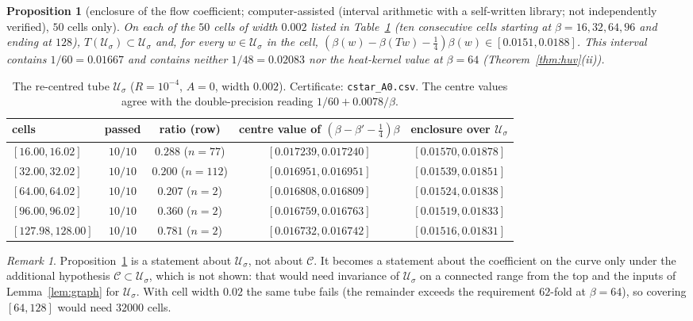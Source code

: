 \documentclass[11pt,a4paper]{article}
\newtheorem{proposition}[theorem]{Proposition}
\theoremstyle{definition}
\theoremstyle{remark}
\newtheorem{remark}[theorem]{Remark}
\newcommand{\code}[1]{\texttt{#1}}
\newcommand{\cU}{\mathcal{U}}
\newcommand{\cC}{\mathcal{C}}
\newcommand{\IA}{computer-assisted (interval arithmetic with a self-written library; not independently verified)}
\begin{document}
\begin{proposition}[enclosure of the flow coefficient; \IA, $50$ cells only]\label{prop:window}
On each of the $50$ cells of width $0.002$ listed in Table~\ref{tab:cstar} (ten consecutive cells starting at $\beta=16,32,64,96$ and ending at $128$), $T(\cU_\sigma)\subset\cU_\sigma$ and, for every $w\in\cU_\sigma$ in the cell, $(\beta(w)-\beta(Tw)-\tfrac14)\beta(w)\in[0.0151,0.0188]$.
This interval contains $1/60=0.01667$ and contains neither $1/48=0.02083$ nor the heat-kernel value at $\beta=64$ (Theorem~\ref{thm:huv}(ii)).
\end{proposition}

\begin{table}[ht]\centering\small
\begin{tabular}{lcccc}
\toprule
cells & passed & ratio (row) & centre value of $(\beta-\beta'-\tfrac14)\beta$ & enclosure over $\cU_\sigma$ \\
\midrule
$[16.00,16.02]$ & $10/10$ & $0.288$ ($n=77$) & $[0.017239,0.017240]$ & $[0.01570,0.01878]$ \\
$[32.00,32.02]$ & $10/10$ & $0.200$ ($n=112$) & $[0.016951,0.016951]$ & $[0.01539,0.01851]$ \\
$[64.00,64.02]$ & $10/10$ & $0.207$ ($n=2$) & $[0.016808,0.016809]$ & $[0.01524,0.01838]$ \\
$[96.00,96.02]$ & $10/10$ & $0.360$ ($n=2$) & $[0.016759,0.016763]$ & $[0.01519,0.01833]$ \\
$[127.98,128.00]$ & $10/10$ & $0.781$ ($n=2$) & $[0.016732,0.016742]$ & $[0.01516,0.01831]$ \\
\bottomrule
\end{tabular}
\caption{The re-centred tube $\cU_\sigma$ ($R=10^{-4}$, $A=0$, width $0.002$). Certificate: \code{cstar\_A0.csv}. The centre values agree with the double-precision reading $1/60+0.0078/\beta$.}\label{tab:cstar}
\end{table}

\begin{remark}
Proposition~\ref{prop:window} is a statement about $\cU_\sigma$, not about $\cC$.
It becomes a statement about the coefficient on the curve only under the additional hypothesis $\cC\subset\cU_\sigma$, which is not shown: that would need invariance of $\cU_\sigma$ on a connected range from the top and the inputs of Lemma~\ref{lem:graph} for $\cU_\sigma$.
With cell width $0.02$ the same tube fails (the remainder exceeds the requirement $62$-fold at $\beta=64$), so covering $[64,128]$ would need $32000$ cells.
\end{remark}
\end{document}
